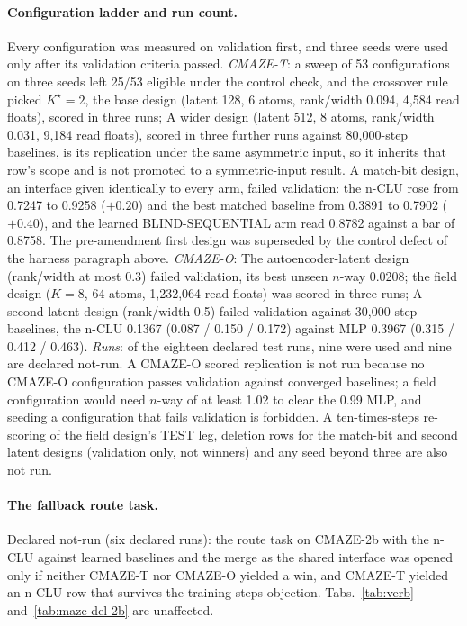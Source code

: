 \documentclass{article} %
\newcommand{\Kstar}{\ensuremath{K^{\star}}}
\begin{document}
\paragraph{Configuration ladder and run count.} Every configuration was measured on validation first,
and three seeds were used only after its validation criteria passed. \emph{CMAZE-T}: a sweep of
53 configurations on three seeds left 25/53 eligible under the control check, and the crossover rule picked
$\Kstar=2$, the base design (latent 128, 6 atoms, rank/width 0.094, 4,584 read floats), scored in three
runs; A wider design (latent 512, 8 atoms, rank/width 0.031, 9,184 read floats), scored in three further
runs against 80,000-step baselines, is its replication under the same asymmetric input, so it inherits that row's scope and is not
promoted to a symmetric-input result. A match-bit design, an interface given identically to
every arm, failed validation: the n-CLU rose from 0.7247 to 0.9258 ($+0.20$) and the best matched
baseline from 0.3891 to 0.7902 ($+0.40$), and the learned BLIND-SEQUENTIAL arm read 0.8782 against a bar
of 0.8758. The pre-amendment first design was superseded by the control defect of the harness paragraph
above. \emph{CMAZE-O}: The autoencoder-latent design (rank/width at most 0.3) failed validation, its
best unseen $n$-way 0.0208; the field design ($K=8$, 64 atoms, 1,232,064 read floats) was scored in
three runs; A second latent design (rank/width 0.5) failed validation against 30,000-step baselines, the n-CLU
0.1367 (0.087 / 0.150 / 0.172) against MLP 0.3967 (0.315 / 0.412 / 0.463). \emph{Runs}: of the eighteen
declared test runs, nine were used and nine are declared not-run. A CMAZE-O scored
replication is not run because no CMAZE-O
configuration passes validation against converged baselines; a field configuration would need $n$-way
of at least 1.02 to clear the 0.99 MLP, and seeding a configuration that fails validation is
forbidden. A ten-times-steps re-scoring of the field design's TEST leg, deletion rows for the match-bit and second latent designs
(validation only, not winners) and any seed beyond three are also not run.
\paragraph{The fallback route task.} Declared not-run (six declared runs): the route task on CMAZE-2b %
with the n-CLU against learned baselines and the merge as the shared interface was opened only if
neither CMAZE-T nor CMAZE-O yielded a win, and CMAZE-T yielded an n-CLU row that survives the
training-steps objection. Tabs.~\ref{tab:verb} and~\ref{tab:maze-del-2b} are unaffected.
\end{document}
